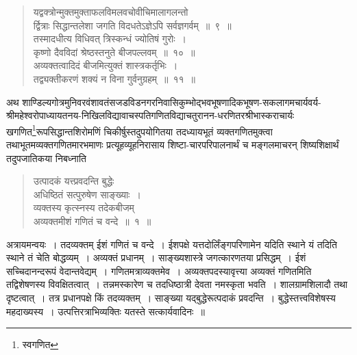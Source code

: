 \documentclass[11pt, openany]{book}
\begin{document}
\begin{quote}
\vspace{-5mm}
यद्वक्त्रोन्मुक्तमुक्ताफलविमलवचोवीचिमालागलन्तो\textendash \\

\vspace{-5mm}
\hspace{0.5cm} र्द्वित्राः सिद्धान्तलेशा जगति विदधतेऽज्ञेऽपि सर्वज्ञगर्वम्~॥~९~॥\\

\vspace{-3mm}
तस्मादधीत्य विधिवत् त्रिस्कन्धं ज्योतिषं गुरोः~। \\

\vspace{-5mm}
कृष्णो दैवविदां श्रेष्ठस्तनुते बीजपल्लवम्~॥~१०~॥\\

\vspace{-3mm}
अव्यक्तत्वादिदं बीजमित्युक्तं शास्त्रकर्तृभिः~। \\

\vspace{-5mm}
तद्व्यक्तीकरणं शक्यं न विना गुर्वनुग्रहम्~॥~११~॥
\end{quote}
\newpage
 \onehalfspacing
 अथ शाण्डिल्यगोत्रमुनिवरवंशावतंसजडविडनगरनिवासिकुम्भोद्भवभूषणादिकभूषण-सकलागमचार्यवर्य-\,श्रीमहेश्वरोपाध्यायतनय-निखिलविद्यावाचस्पतिगणितविद्याचतुरानन-धरणितरश्रीभास्कराचार्यः खगणित\renewcommand{\thefootnote}{*}\footnote{स्वगणित}रूपसिद्धान्तशिरोमणिं
चिकीर्षुस्तदुपयोगितया तदध्यायभूतं व्यक्तगणितमुक्त्वा तथाभूतमव्यक्तगणितमारभमाणः 
प्रत्यूहव्यूहनिरासाय शिष्टा-चारपरिपालनार्थं च मङ्गलमाचरन्
शिष्यशिक्षार्थं तदुपजातिकया निबध्नाति\textendash  
\begin{quote}
    \bs
    उत्पादकं यत्त्प्रवदन्ति बुद्धेः \\
    
\vspace{-7mm}
\hspace{1cm} अधिष्ठितं सत्पुरुषेण साङ्ख्याः~। \\
 
\vspace{-7mm}
 व्यक्तस्य कृत्स्नस्य तदेकबीजम् \\
 
\vspace{-7mm}
\hspace{1cm} अव्यक्तमीशं गणितं च वन्दे~॥~१~॥
\end{quote}

 अत्रायमन्वयः~। तदव्यक्तम् ईशं गणितं च वन्दे~। ईशपक्षे 
यत्तदोर्लिंङ्गपरिणामेन यदिति स्थाने यं तदिति स्थाने तं चेति बोद्धव्यम्~।
अव्यक्तं प्रधानम्~। साङ्ख्यशास्त्रे जगत्कारणतया प्रसिद्धम्~। ईशं
सच्चिदानन्दरूपं वेदान्तवेद्यम्~। गणितमत्राव्यक्तमेव~। अव्यक्तपदस्यावृत्त्या 
अव्यक्तं गणितमिति तद्विशेषणस्य विवक्षितत्वात्~। तन्नमस्कारेण च तदधिष्ठात्री देवता नमस्कृता भवति~। शालग्रामशिलादौ तथा दृष्टत्वात्~। तत्र 
प्रधानपक्षे किं तदव्यक्तम्~। साङ्ख्या यद्बुद्धेरूत्पदाकं प्रवदन्ति~।
बुद्धेस्तत्त्वविशेषस्य महदाख्यस्य~। उत्पत्तिरत्राभिव्यक्तिः यतस्ते सत्कार्यवादिनः~॥\\
\end{document}
